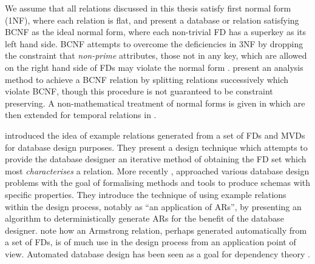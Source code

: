 We assume that all relations discussed in this thesis
satisfy first normal form (1NF), where each relation is flat, and
present a database or relation satisfying BCNF as the ideal normal form,
where each non-trivial FD has a superkey as its left hand side. BCNF
attempts to 
overcome the deficiencies in 3NF by dropping the constraint that {\em
non-prime} attributes, those not in any key, which are allowed on the
right hand side of FDs may violate the normal
form . \cite{bb79}
present an analysis method to achieve a BCNF relation by splitting
relations successively which violate BCNF, though this procedure is
not guaranteed to be constraint preserving.  A non-mathematical
treatment of normal 
forms is given in \cite{ken83} which are then extended for temporal 
relations in \cite{jss92}. 
\medskip
{}

\cite{sm81} introduced the
idea of example relations generated from a set of FDs and MVDs  for 
database design purposes. 
They present a design technique which attempts to provide the
database designer an iterative method of obtaining the FD set which
most {\em characterises} a relation.  More recently  \cite{mr86,mr92},
approached various database 
design problems with the goal of formalising methods and tools to
produce schemas with specific properties. They 
introduce the technique of using example relations within the design
process, notably as ``an application of ARs'', by presenting an
algorithm to deterministically generate ARs for the benefit of the
database designer.  \cite{bdfs84} note how an
Armstrong relation, perhaps generated automatically from a set of FDs, is of
much use in the design process from an application point of view.
Automated database design has 
been seen as a goal for dependency theory \cite{bv84}.

\medskip

